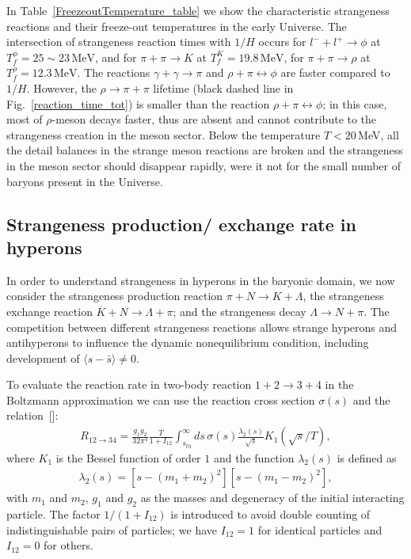 In Table~\ref{FreezeoutTemperature_table} we show the characteristic strangeness reactions and their freeze-out temperatures in the early Universe. The intersection of strangeness reaction times with $1/H$ occurs for $l^-+l^+\rightarrow\phi$ at $T_f^\phi=25\sim23\,\mathrm{MeV}$, and for $\pi+\pi\rightarrow K$ at $T_f^K=19.8\,\mathrm{MeV}$, for $\pi+\pi\rightarrow\rho$ at $T_f^\rho=12.3\,\mathrm{MeV}$. The reactions $\gamma+\gamma\rightarrow\pi$ and $\rho+\pi\leftrightarrow\phi$ are faster compared to $1/H$. However, the $\rho\to\pi+\pi$ lifetime (black dashed line in Fig.~\ref{reaction_time_tot}) is smaller than the reaction $\rho+\pi\leftrightarrow\phi$; in this case, most of $\rho$-meson decays faster, thus are absent and cannot contribute to the strangeness creation in the meson sector. Below the temperature $T<20$\,MeV, all the detail balances in the strange meson reactions are broken and the strangeness in the meson sector should disappear rapidly, were it not for the small number of baryons present in the Universe.






\subsection{Strangeness production/ exchange rate in hyperons}
In order to understand strangeness in hyperons in the baryonic domain, we now consider the strangeness production reaction $\pi +N\rightarrow K+\Lambda$, the strangeness exchange reaction $\overline{K}+N\rightarrow \Lambda+\pi$; and the strangeness decay $\Lambda\rightarrow N+\pi$. The competition between different strangeness reactions allows strange hyperons and antihyperons to influence the dynamic nonequilibrium condition, including development of $\langle s-\bar s\rangle \ne 0$. %

To evaluate the reaction rate in two-body reaction $1+2\rightarrow3+4$ in the Boltzmann approximation we can use the reaction cross section $\sigma(s)$ and the relation~[\cite{Letessier:2002ony}]:
\begin{align}
R_{12\rightarrow34}=\frac{g_1g_2}{32\pi^4}\frac{T}{1+I_{12}}\!\!\int^\infty_{s_{th}}\!\!\!\!ds\,\sigma(s)\frac{\lambda_2(s)}{\sqrt{s}}\!K_1\!\!\left({\sqrt{s}}/{T}\right),
\end{align}
where $K_1$ is the Bessel function of order $1$ and the function $\lambda_2(s)$ is defined as
\begin{align}
\lambda_2(s)=\left[s-(m_1+m_2)^2\right]\left[s-(m_1-m_2)^2\right],
\end{align}
with $m_1$ and $m_2$, $g_1$ and $g_2$ as the masses and degeneracy of the initial interacting particle. The factor $1/(1+I_{12})$ is introduced to avoid double counting of indistinguishable pairs of particles; we have $I_{12}=1$ for identical particles and $I_{12}=0$ for others. 


